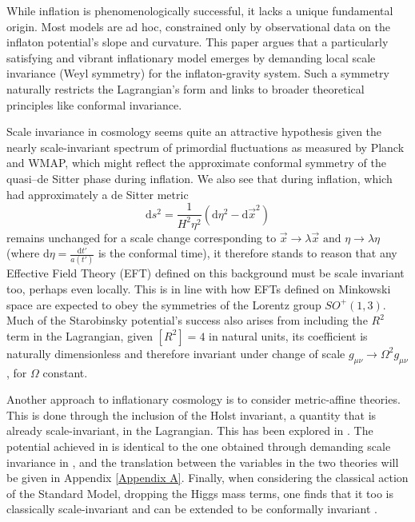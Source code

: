\documentclass[aps,prd,reprint,preprintnumbers,showpacs,floatfix,nofootinbib,superscript address]{revtex4-2}
\begin{document}
While inflation is phenomenologically successful, it lacks a unique fundamental origin. Most models are ad hoc, constrained only by observational data on the inflaton potential’s slope and curvature. This paper argues that a particularly satisfying and vibrant inflationary model emerges by demanding local scale invariance (Weyl symmetry) for the inflaton-gravity system. Such a symmetry naturally restricts the Lagrangian’s form and links to broader theoretical principles like conformal invariance.

Scale invariance in cosmology seems quite an attractive hypothesis given the nearly scale-invariant spectrum of primordial fluctuations as measured by Planck and WMAP, which might reflect the approximate conformal symmetry of the quasi–de Sitter phase during inflation. We also see that during inflation, which had approximately a de Sitter metric
\begin{equation} \label{deSitter Conformal}
    \text{d}s^2 = \frac{1}{H^2\eta^2}(\text{d}\eta^2 - \text{d}\Vec{x}^2)
\end{equation} 
remains unchanged for a scale change corresponding to $\Vec{x} \rightarrow \lambda \Vec{x} \,\, \text{and} \,\, \eta \rightarrow \lambda \eta$ (where $\text{d}\eta =  \frac{\text{d}t'}{a(t')}$ is the conformal time), it therefore stands to reason that any Effective Field Theory (EFT) defined on this background must be scale invariant too, perhaps even locally. This is in line with how EFTs defined on Minkowski space are expected to obey the symmetries of the Lorentz group $SO^+(1,3)$. Much of the Starobinsky potential's success also arises from including the $R^2$ term in the Lagrangian, given $[R^2] = 4$ in natural units, its coefficient is naturally dimensionless and therefore invariant under change of scale $g_{\mu\nu} \rightarrow \Omega^2 g_{\mu\nu}$, for $\Omega$ constant.

Another approach to inflationary cosmology is to consider metric-affine theories. This is done through the inclusion of the Holst invariant, a quantity that is already scale-invariant, in the Lagrangian. This has been explored in \cite{Salvio_2022, pradisi2022equivalence}. The potential achieved in \cite{Salvio_2022} is identical to the one obtained through demanding scale invariance in \cite{barker2024poincaregaugetheoryconformal}, and the translation between the variables in the two theories will be given in Appendix \ref{Appendix A}. Finally, when considering the classical action of the Standard Model, dropping the Higgs mass terms, one finds that it too is classically scale-invariant and can be extended to be conformally invariant \cite{bardeen1995naturalness, bars2014local}.
\end{document}

